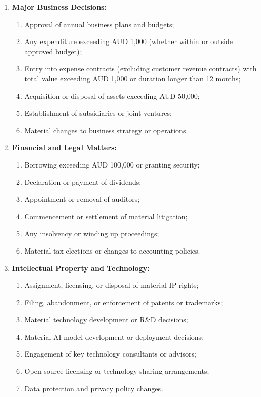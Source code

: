 \begin{enumerate}[label=\arabic*.]
    \item \textbf{Major Business Decisions:}
        \begin{enumerate}[label=(\alph*)]
            \item Approval of annual business plans and budgets;
            \item Any expenditure exceeding AUD 1,000 (whether within or outside approved budget);
            \item Entry into expense contracts (excluding customer revenue contracts) with total value exceeding AUD 1,000 or duration longer than 12 months;
            \item Acquisition or disposal of assets exceeding AUD 50,000;
            \item Establishment of subsidiaries or joint ventures;
            \item Material changes to business strategy or operations.
        \end{enumerate}

    \item \textbf{Financial and Legal Matters:}
        \begin{enumerate}[label=(\alph*)]
            \item Borrowing exceeding AUD 100,000 or granting security;
            \item Declaration or payment of dividends;
            \item Appointment or removal of auditors;
            \item Commencement or settlement of material litigation;
            \item Any insolvency or winding up proceedings;
            \item Material tax elections or changes to accounting policies.
        \end{enumerate}

    \item \textbf{Intellectual Property and Technology:}
        \begin{enumerate}[label=(\alph*)]
            \item Assignment, licensing, or disposal of material IP rights;
            \item Filing, abandonment, or enforcement of patents or trademarks;
            \item Material technology development or R\&D decisions;
            \item Material AI model development or deployment decisions;
            \item Engagement of key technology consultants or advisors;
            \item Open source licensing or technology sharing arrangements;
            \item Data protection and privacy policy changes.
        \end{enumerate}
\end{enumerate}

